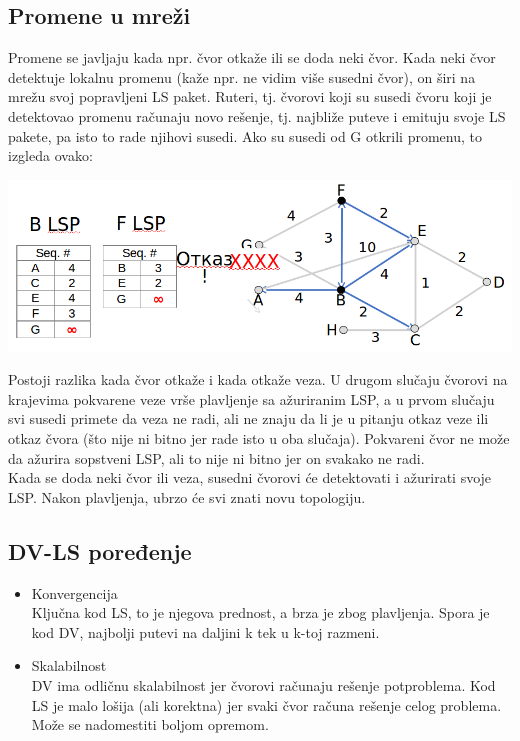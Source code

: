 \documentclass{article} %
\begin{document}
\subsection{Promene u mreži}
Promene se javljaju kada npr. čvor otkaže ili se doda neki čvor. Kada neki čvor detektuje lokalnu promenu (kaže npr. ne vidim više susedni čvor), on širi na mrežu svoj popravljeni LS paket. Ruteri, tj. čvorovi koji su susedi čvoru koji je detektovao promenu računaju novo rešenje, tj. najbliže puteve i emituju svoje LS pakete, pa isto to rade njihovi susedi.
Ako su susedi od G otkrili promenu, to izgleda ovako:
\begin{center}
	\includegraphics[scale=0.4]{LSP3}
\end{center}
Postoji razlika kada čvor otkaže i kada otkaže veza. U drugom slučaju čvorovi na krajevima pokvarene veze vrše plavljenje sa ažuriranim LSP, a u prvom slučaju svi susedi primete da veza ne radi, ali ne znaju da li je u pitanju otkaz veze ili otkaz čvora (što nije ni bitno jer rade isto u oba slučaja). Pokvareni čvor ne može da ažurira sopstveni LSP, ali to nije ni bitno jer on svakako ne radi.\\
Kada se doda neki čvor ili veza, susedni čvorovi će detektovati i ažurirati svoje LSP. Nakon plavljenja, ubrzo će svi znati novu topologiju.\\
\subsection{DV-LS poređenje}
\begin{itemize}
  \item Konvergencija\\
  Ključna kod LS, to je njegova prednost, a brza je zbog plavljenja. Spora je kod DV, najbolji putevi na daljini k tek u k-toj razmeni.
  \item Skalabilnost\\
  DV ima odličnu skalabilnost jer čvorovi računaju rešenje potproblema. Kod LS je malo lošija (ali korektna) jer svaki čvor računa rešenje celog problema. Može se nadomestiti boljom opremom.
\end{itemize}
\end{document}
